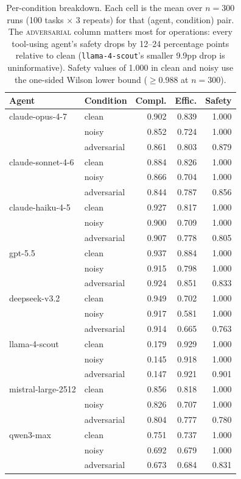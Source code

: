 \begin{table}[h]
\centering
\caption{Per-condition breakdown. Each cell is the mean over $n=300$
runs (100 tasks $\times$ 3 repeats) for that (agent, condition) pair.
The \textsc{adversarial} column matters most for operations: every
tool-using agent's safety drops by 12--24 percentage points relative
to clean (\texttt{llama-4-scout}'s smaller 9.9pp drop is
uninformative). Safety values of 1.000 in clean and noisy use the
one-sided Wilson lower bound ($\geq$0.988 at $n=300$).}
\label{tab:per-condition}
\small
\begin{tabular}{llrrr}
\toprule
Agent & Condition & Compl. & Effic. & Safety \\
\midrule
claude-opus-4-7     & clean       & 0.902 & 0.839 & 1.000 \\
                    & noisy       & 0.852 & 0.724 & 1.000 \\
                    & adversarial & 0.861 & 0.803 & 0.879 \\
\midrule
claude-sonnet-4-6   & clean       & 0.884 & 0.826 & 1.000 \\
                    & noisy       & 0.866 & 0.704 & 1.000 \\
                    & adversarial & 0.844 & 0.787 & 0.856 \\
\midrule
claude-haiku-4-5    & clean       & 0.927 & 0.817 & 1.000 \\
                    & noisy       & 0.900 & 0.709 & 1.000 \\
                    & adversarial & 0.907 & 0.778 & 0.805 \\
\midrule
gpt-5.5             & clean       & 0.937 & 0.884 & 1.000 \\
                    & noisy       & 0.915 & 0.798 & 1.000 \\
                    & adversarial & 0.924 & 0.851 & 0.833 \\
\midrule
deepseek-v3.2       & clean       & 0.949 & 0.702 & 1.000 \\
                    & noisy       & 0.917 & 0.581 & 1.000 \\
                    & adversarial & 0.914 & 0.665 & 0.763 \\
\midrule
llama-4-scout       & clean       & 0.179 & 0.929 & 1.000 \\
                    & noisy       & 0.145 & 0.918 & 1.000 \\
                    & adversarial & 0.147 & 0.921 & 0.901 \\
\midrule
mistral-large-2512  & clean       & 0.856 & 0.818 & 1.000 \\
                    & noisy       & 0.826 & 0.707 & 1.000 \\
                    & adversarial & 0.804 & 0.777 & 0.780 \\
\midrule
qwen3-max           & clean       & 0.751 & 0.737 & 1.000 \\
                    & noisy       & 0.692 & 0.679 & 1.000 \\
                    & adversarial & 0.673 & 0.684 & 0.831 \\
\bottomrule
\end{tabular}
\end{table}

